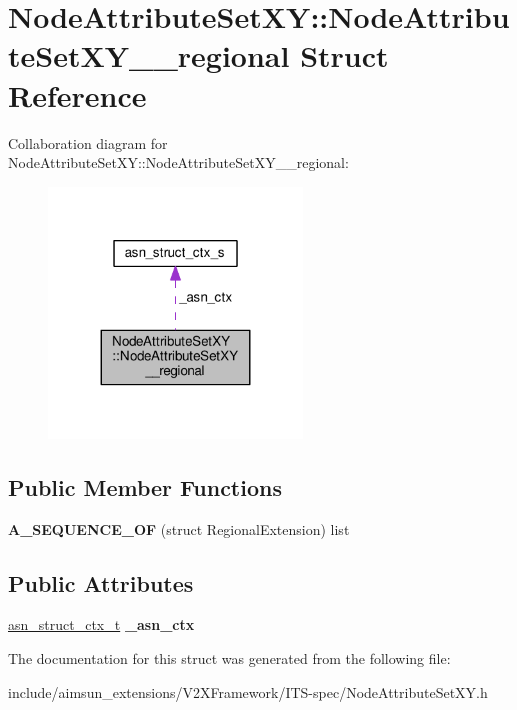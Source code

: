 \hypertarget{structNodeAttributeSetXY_1_1NodeAttributeSetXY____regional}{}\section{Node\+Attribute\+Set\+XY\+:\+:Node\+Attribute\+Set\+X\+Y\+\_\+\+\_\+regional Struct Reference}
\label{structNodeAttributeSetXY_1_1NodeAttributeSetXY____regional}


Collaboration diagram for Node\+Attribute\+Set\+XY\+:\+:Node\+Attribute\+Set\+X\+Y\+\_\+\+\_\+regional\+:\nopagebreak
\begin{figure}[H]
\begin{center}
\leavevmode
\includegraphics[width=191pt]{structNodeAttributeSetXY_1_1NodeAttributeSetXY____regional__coll__graph}
\end{center}
\end{figure}
\subsection*{Public Member Functions}
\begin{DoxyCompactItemize}
\item 
{\bfseries A\+\_\+\+S\+E\+Q\+U\+E\+N\+C\+E\+\_\+\+OF} (struct Regional\+Extension) list\hypertarget{structNodeAttributeSetXY_1_1NodeAttributeSetXY____regional_aa056f4434be094b66cb3a286c4714024}{}\label{structNodeAttributeSetXY_1_1NodeAttributeSetXY____regional_aa056f4434be094b66cb3a286c4714024}

\end{DoxyCompactItemize}
\subsection*{Public Attributes}
\begin{DoxyCompactItemize}
\item 
\hyperlink{structasn__struct__ctx__s}{asn\+\_\+struct\+\_\+ctx\+\_\+t} {\bfseries \+\_\+asn\+\_\+ctx}\hypertarget{structNodeAttributeSetXY_1_1NodeAttributeSetXY____regional_a7c349429e791875bc9b04723c65818a7}{}\label{structNodeAttributeSetXY_1_1NodeAttributeSetXY____regional_a7c349429e791875bc9b04723c65818a7}

\end{DoxyCompactItemize}


The documentation for this struct was generated from the following file\+:\begin{DoxyCompactItemize}
\item 
include/aimsun\+\_\+extensions/\+V2\+X\+Framework/\+I\+T\+S-\/spec/Node\+Attribute\+Set\+X\+Y.\+h\end{DoxyCompactItemize}

